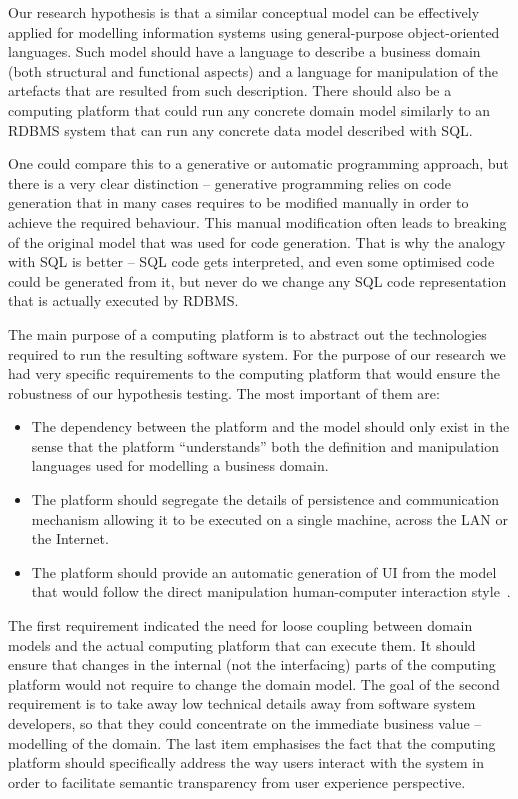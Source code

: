 \documentclass[a4paper,12pt,oneside,openright,final]{memoir} %
\begin{document}
  Our research hypothesis is that a similar conceptual model can be effectively applied for modelling information systems using general-purpose object-oriented languages.
  Such model should have a language to describe a business domain (both structural and functional aspects) and a language for manipulation of the artefacts that are resulted from such description.
  There should also be a computing platform that could run any concrete domain model similarly to an RDBMS system that can run any concrete data model described with SQL.
  
  One could compare this to a generative or automatic programming approach, but there is a very clear distinction -- generative programming relies on code generation that in many cases requires to be modified manually in order to achieve the required behaviour.
  This manual modification often leads to breaking of the original model that was used for code generation.
  That is why the analogy with SQL is better -- SQL code gets interpreted, and even some optimised code could be generated from it, but never do we change any SQL code representation that is actually executed by RDBMS.
    
  The main purpose of a computing platform is to abstract out the technologies required to run the resulting software system.
  For the purpose of our research we had very specific requirements to the computing platform that would ensure the robustness of our hypothesis testing.
  The most important of them are:
  \begin{itemize}
    \item The dependency between the platform and the model should only exist in the sense that the platform ``understands'' both the definition and manipulation languages used for modelling a business domain.
    \item The platform should segregate the details of persistence and communication mechanism allowing it to be executed on a single machine, across the LAN or the Internet.
    \item The platform should provide an automatic generation of UI from the model that would follow the direct manipulation human-computer interaction style~\cite{shneiderman1982, shneiderman1983}.
  \end{itemize}

  The first requirement indicated the need for loose coupling between domain models and the actual computing platform that can execute them.
  It should ensure that changes in the internal (not the interfacing) parts of the computing platform would not require to change the domain model.
  The goal of the second requirement is to take away low technical details away from software system developers, so that they could concentrate on the immediate business value -- modelling of the domain.
  The last item emphasises the fact that the computing platform should specifically address the way users interact with the system in order to facilitate semantic transparency from user experience perspective.
\end{document}
